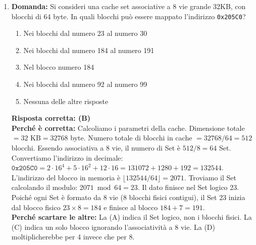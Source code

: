 \documentclass[12pt, a4paper]{article}
\begin{document}
\begin{enumerate}
\newpage

    \item \textbf{Domanda:} Si consideri una cache set associative a 8 vie grande 32KB, con blocchi di 64 byte. In quali blocchi può essere mappato l'indirizzo \texttt{0x205C0}?
    \begin{enumerate}[label=(\Alph*)]
        \item Nei blocchi dal numero 23 al numero 30
        \item Nei blocchi dal numero 184 al numero 191
        \item Nel blocco numero 184
        \item Nei blocchi dal numero 92 al numero 99
        \item Nessuna delle altre risposte
    \end{enumerate}
    \textbf{Risposta corretta: (B)} \\
    \textbf{Perché è corretta:} Calcoliamo i parametri della cache. Dimensione totale $= 32\text{ KB} = 32768$ byte. Numero totale di blocchi in cache $= 32768 / 64 = 512$ blocchi. Essendo associativa a 8 vie, il numero di Set è $512 / 8 = 64$ Set.
    Convertiamo l'indirizzo in decimale: $\texttt{0x205C0} = 2 \cdot 16^4 + 5 \cdot 16^2 + 12 \cdot 16 = 131072 + 1280 + 192 = 132544$.
    L'indirizzo del blocco in memoria è $\lfloor 132544 / 64 \rfloor = 2071$.
    Troviamo il Set calcolando il modulo: $2071 \bmod 64 = 23$.
    Il dato finisce nel Set logico 23. Poiché ogni Set è formato da 8 vie (8 blocchi fisici contigui), il Set 23 inizia dal blocco fisico $23 \times 8 = 184$ e finisce al blocco $184 + 7 = 191$. \\
    \textbf{Perché scartare le altre:} La (A) indica il Set logico, non i blocchi fisici. La (C) indica un solo blocco ignorando l'associatività a 8 vie. La (D) moltiplicherebbe per 4 invece che per 8.


\end{enumerate}
\end{document}
